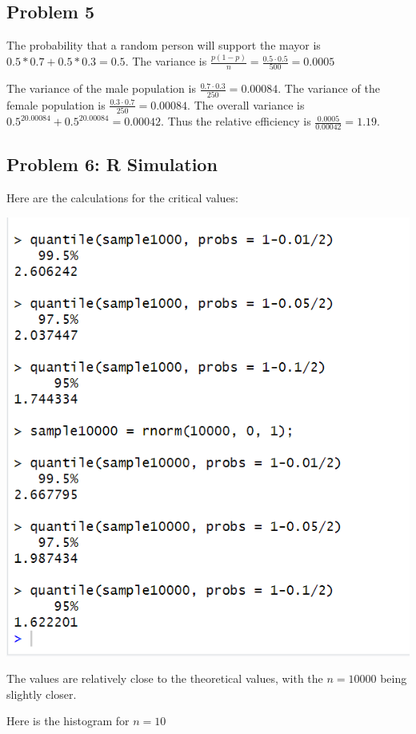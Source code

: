 \documentclass{article}
\begin{document}
\subsection*{Problem 5}
The probability that a random person will support the mayor is 
$0.5*0.7+0.5*0.3 = 0.5$. 
The variance is $\frac{p(1-p)}{n} = \frac{0.5\cdot 0.5}{500} = 0.0005$

The variance of the male population is $\frac{0.7\cdot0.3}{250} = 0.00084$.
The variance of the female population is $\frac{0.3\cdot0.7}{250} = 0.00084$.
The overall variance is 
$0.5^20.00084 + 0.5^20.00084 = 0.00042$.
Thus the relative efficiency is $\frac{0.0005}{0.00042} = 1.19$.
\newpage

\subsection*{Problem 6: R Simulation}
Here are the calculations for the critical values:

\includegraphics*{parta.png}

The values are relatively close to the theoretical values,
with the $n=10000$ being slightly closer.

Here is the histogram for $n=10$
\end{document}
